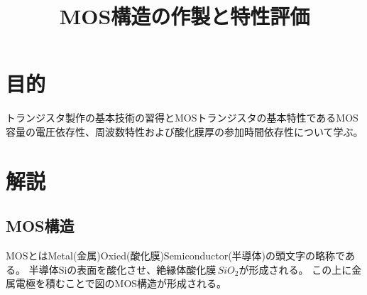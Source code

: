 \documentclass[11pt]{jarticle}
\title{MOS構造の作製と特性評価}
\begin{document}
\maketitle

\section{目的}
	トランジスタ製作の基本技術の習得とMOSトランジスタの基本特性であるMOS容量の電圧依存性、周波数特性および酸化膜厚の参加時間依存性について学ぶ。

\section{解説}
	\subsection{MOS構造}
		MOSとはMetal(金属)\-Oxied(酸化膜)\-Semiconductor(半導体)の頭文字の略称である。
		半導体Siの表面を酸化させ、絶縁体酸化膜\,$SiO_{2}$が形成される。
		この上に金属電極を積むことで図のMOS構造が形成される。
\end{document}
